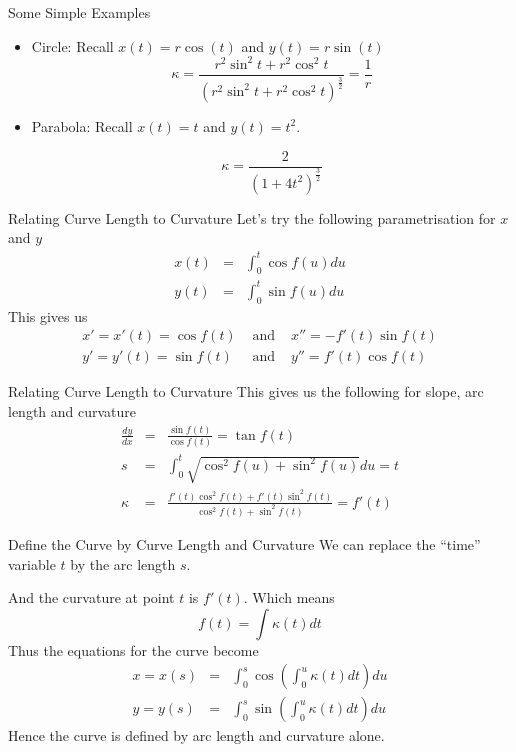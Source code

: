 \documentclass{beamer}
\begin{document}
\begin{frame}{Some Simple Examples}
	\begin{itemize}	
		\item Circle: Recall $x(t)=r \cos(t)$ and $y(t)= r \sin(t)$ 
		\[
		\kappa = \frac{r^2 \sin^2 t + r^2 \cos^2 t}{\left(r^2 \sin^2 t + r^2 \cos^2 t \right) ^ \frac{3}{2}} = \frac{1}{r}
		\]
		
		\item Parabola: Recall $x(t)=t$ and $y(t)=t^2$. 
		
		\[
		\kappa = \frac{2}{\left(1 + 4t^2 \right) ^ \frac{3}{2}}
		\]
	\end{itemize}
\end{frame}

\begin{frame}{Relating Curve Length to Curvature}
	Let's try the following parametrisation for $x$ and $y$
	\begin{eqnarray*}
		x(t) &=& \int_{0}^{t} \cos f(u) du \\
		y(t) &=& \int_{0}^{t} \sin f(u) du
	\end{eqnarray*}
	This gives us
	\begin{eqnarray*}
		x' = x'(t) = \cos f(t) &\mbox{ and }& x''=-f'(t) \sin f(t) \\
		y' = y'(t) = \sin f(t) &\mbox{ and }& y''=f'(t) \cos f(t)
	\end{eqnarray*}
\end{frame}

\begin{frame}{Relating Curve Length to Curvature}
	This gives us the following for slope, arc length and curvature
	\begin{eqnarray*}
	\frac{dy}{dx} &=& \frac{\sin f(t)}{\cos f(t)} = \tan f(t) \\
 	s &=& \int_0^t \sqrt{\cos^2 f(u) + \sin^2 f(u)} du = t \\
 	\kappa &=& \frac{f'(t) \cos^2 f(t) + f'(t) \sin^2 f(t)}{\cos^2 f(t) + \sin^2 f(t)} = f'(t)
 \end{eqnarray*}
\end{frame}

\begin{frame}{Define the Curve by Curve Length and Curvature}
	We can replace the ``time'' variable $t$ by the arc length $s$.
	 
	And the curvature at point $t$ is $f'(t)$. Which means
	 \[
	 f(t) = \int \kappa(t) dt
	 \]
	Thus the equations for the curve become
	\begin{eqnarray*}
	x = x(s) &=& \int_{0}^{s} \cos \left( \int_0^u \kappa(t) dt \right) du \\
	y = y(s) &=& \int_{0}^{s} \sin \left( \int_0^u \kappa(t) dt \right) du
	\end{eqnarray*}
	Hence the curve is defined by arc length and curvature alone.
\end{frame}
\end{document}
